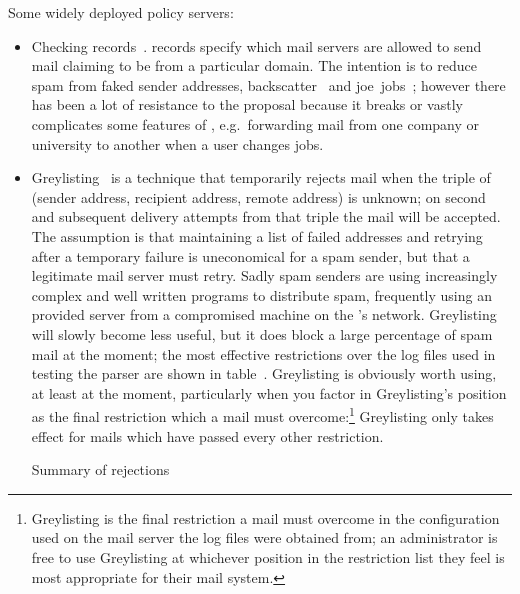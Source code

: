 Some widely deployed policy servers:

\begin{itemize}

    \item Checking \SPF{} records~\cite{openspf, Wikipedia-spf}.
        \SPF{}\label{spf introduction} records specify which mail servers
        are allowed to send mail claiming to be from a particular domain.
        The intention is to reduce spam from faked sender addresses,
        backscatter~\cite{postfix-backscatter} and
        joe~jobs~\cite{Wikipedia-joe-job}; however there has been a lot of
        resistance to the proposal because it breaks or vastly complicates
        some features of \SMTP{}, e.g.\ forwarding mail from one company or
        university to another when a user changes jobs.

    \item Greylisting~\cite{greylisting} is a technique that temporarily
        rejects mail when the triple of (sender address, recipient address,
        remote \IP{} address) is unknown; on second and subsequent delivery
        attempts from that triple the mail will be accepted.  The
        assumption is that maintaining a list of failed addresses and
        retrying after a temporary failure is uneconomical for a spam
        sender, but that a legitimate mail server must retry.  Sadly spam
        senders are using increasingly complex and well written programs to
        distribute spam, frequently using an \ISP{} provided \SMTP{} server
        from a compromised machine on the \ISP{}'s network.  Greylisting
        will slowly become less useful, but it does block a large
        percentage of spam mail at the moment; the most effective
        restrictions over the \numberOFlogFILES{} log files used in testing
        the parser are shown in table~.
        Greylisting is obviously worth using, at least at the moment,
        particularly when you factor in Greylisting's position as the final
        restriction which a mail must overcome:\footnote{Greylisting is the
        final restriction a mail must overcome in the configuration used on
        the mail server the log files were obtained from; an administrator
        is free to use Greylisting at whichever position in the restriction
        list they feel is most appropriate for their mail system.}
        Greylisting only takes effect for mails which have passed every
        other restriction.

        \begin{table}[ht]
            \caption{Summary of rejections}\label{Summary of rejections}
            
        \end{table}


\end{itemize}
